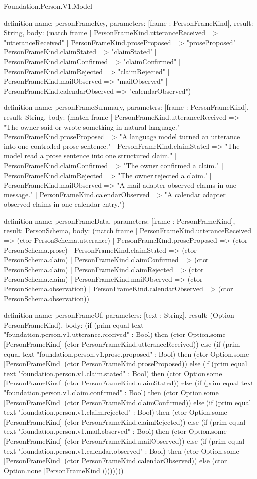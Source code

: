 \begin{lexlean}{Foundation.Person.V1.Model}
\begin{semanticmodule}
definition{
  name: personFrameKey,
  parameters: [frame : PersonFrameKind],
  result: String,
  body: (match frame
    | PersonFrameKind.utteranceReceived => "utteranceReceived"
    | PersonFrameKind.proseProposed => "proseProposed"
    | PersonFrameKind.claimStated => "claimStated"
    | PersonFrameKind.claimConfirmed => "claimConfirmed"
    | PersonFrameKind.claimRejected => "claimRejected"
    | PersonFrameKind.mailObserved => "mailObserved"
    | PersonFrameKind.calendarObserved => "calendarObserved")
}

definition{
  name: personFrameSummary,
  parameters: [frame : PersonFrameKind],
  result: String,
  body: (match frame
    | PersonFrameKind.utteranceReceived => "The owner said or wrote something in natural language."
    | PersonFrameKind.proseProposed => "A language model turned an utterance into one controlled prose sentence."
    | PersonFrameKind.claimStated => "The model read a prose sentence into one structured claim."
    | PersonFrameKind.claimConfirmed => "The owner confirmed a claim."
    | PersonFrameKind.claimRejected => "The owner rejected a claim."
    | PersonFrameKind.mailObserved => "A mail adapter observed claims in one message."
    | PersonFrameKind.calendarObserved => "A calendar adapter observed claims in one calendar entry.")
}

definition{
  name: personFrameData,
  parameters: [frame : PersonFrameKind],
  result: PersonSchema,
  body: (match frame
    | PersonFrameKind.utteranceReceived => (ctor PersonSchema.utterance)
    | PersonFrameKind.proseProposed => (ctor PersonSchema.prose)
    | PersonFrameKind.claimStated => (ctor PersonSchema.claim)
    | PersonFrameKind.claimConfirmed => (ctor PersonSchema.claim)
    | PersonFrameKind.claimRejected => (ctor PersonSchema.claim)
    | PersonFrameKind.mailObserved => (ctor PersonSchema.observation)
    | PersonFrameKind.calendarObserved => (ctor PersonSchema.observation))
}

definition{
  name: personFrameOf,
  parameters: [text : String],
  result: (Option PersonFrameKind),
  body: (if (prim equal text "foundation.person.v1.utterance.received" : Bool) then (ctor Option.some [PersonFrameKind] (ctor PersonFrameKind.utteranceReceived)) else (if (prim equal text "foundation.person.v1.prose.proposed" : Bool) then (ctor Option.some [PersonFrameKind] (ctor PersonFrameKind.proseProposed)) else (if (prim equal text "foundation.person.v1.claim.stated" : Bool) then (ctor Option.some [PersonFrameKind] (ctor PersonFrameKind.claimStated)) else (if (prim equal text "foundation.person.v1.claim.confirmed" : Bool) then (ctor Option.some [PersonFrameKind] (ctor PersonFrameKind.claimConfirmed)) else (if (prim equal text "foundation.person.v1.claim.rejected" : Bool) then (ctor Option.some [PersonFrameKind] (ctor PersonFrameKind.claimRejected)) else (if (prim equal text "foundation.person.v1.mail.observed" : Bool) then (ctor Option.some [PersonFrameKind] (ctor PersonFrameKind.mailObserved)) else (if (prim equal text "foundation.person.v1.calendar.observed" : Bool) then (ctor Option.some [PersonFrameKind] (ctor PersonFrameKind.calendarObserved)) else (ctor Option.none [PersonFrameKind]))))))))
}


\end{semanticmodule}
\end{lexlean}
